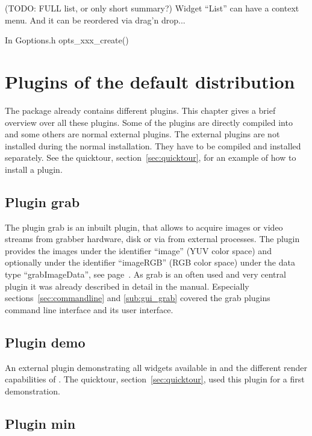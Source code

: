 (TODO: FULL list, or only short summary?)
Widget ``List'' can have a context menu. And it can be reordered via
drag'n drop...

In Goptions.h
opts\_xxx\_create()

\chapter{Plugins of the default distribution}

The \icewing{} package already contains different plugins. This
chapter gives a brief overview over all these plugins. Some of the
plugins are directly compiled into \icewing{} and some others are
normal external plugins. The external plugins are not installed
during the normal \icewing{} installation. They have to be compiled
and installed separately. See the quicktour,
section~\ref{sec:quicktour}, for an example of how to install a
plugin.

\section{Plugin grab}

The plugin grab is an inbuilt plugin, that allows to acquire images
or video streams from grabber hardware, disk or via \dacs{} from
external processes. The plugin provides the images under the
identifier ``image'' (YUV color space) and optionally under the
identifier ``imageRGB'' (RGB color space) under the data type
``grabImageData'', see page~. As
grab is an often used and very central plugin it was already
described in detail in the manual. Especially
sections~\ref{sec:commandline} and \ref{sub:gui_grab} covered the
grab plugins command line interface and its user interface.

\section{Plugin demo}

An external plugin demonstrating all widgets available in \icewing{}
and the different render capabilities of \icewing{}. The quicktour,
section~\ref{sec:quicktour}, used this plugin for a first \icewing{}
demonstration.

\section{Plugin min}

